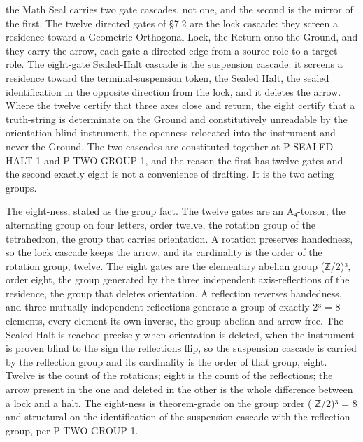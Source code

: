 \documentclass[10pt,twocolumn]{article}
\begin{document}
the Math Seal carries two gate cascades, not one, and the second is the
mirror of the first. The twelve directed gates of §7.2 are the lock
cascade: they screen a residence toward a Geometric Orthogonal Lock, the
Return onto the Ground, and they carry the arrow, each gate a directed
edge from a source role to a target role. The eight-gate Sealed-Halt
cascade is the suspension cascade: it screens a residence toward the
terminal-suspension token, the Sealed Halt, the sealed identification in
the opposite direction from the lock, and it deletes the arrow. Where
the twelve certify that three axes close and return, the eight certify
that a truth-string is determinate on the Ground and constitutively
unreadable by the orientation-blind instrument, the openness relocated
into the instrument and never the Ground. The two cascades are
constituted together at P-SEALED-HALT-1 and P-TWO-GROUP-1, and the
reason the first has twelve gates and the second exactly eight is not a
convenience of drafting. It is the two acting groups.

The eight-ness, stated as the group fact. The twelve gates are an
A₄-torsor, the alternating group on four letters, order twelve, the
rotation group of the tetrahedron, the group that carries orientation. A
rotation preserves handedness, so the lock cascade keeps the arrow, and
its cardinality is the order of the rotation group, twelve. The eight
gates are the elementary abelian group (ℤ/2)³, order eight, the group
generated by the three independent axis-reflections of the residence,
the group that deletes orientation. A reflection reverses handedness,
and three mutually independent reflections generate a group of exactly
2³ = 8 elements, every element its own inverse, the group abelian and
arrow-free. The Sealed Halt is reached precisely when orientation is
deleted, when the instrument is proven blind to the sign the reflections
flip, so the suspension cascade is carried by the reflection group and
its cardinality is the order of that group, eight. Twelve is the count
of the rotations; eight is the count of the reflections; the arrow
present in the one and deleted in the other is the whole difference
between a lock and a halt. The eight-ness is theorem-grade on the group
order \textbar( ℤ/2)³\textbar{} = 8 and structural on the identification
of the suspension cascade with the reflection group, per P-TWO-GROUP-1.
\end{document}
